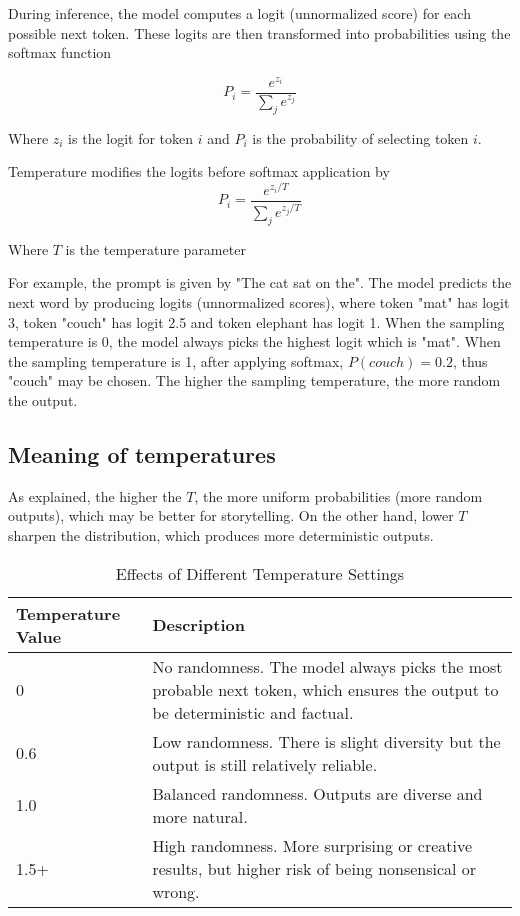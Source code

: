 \documentclass{article} %
\begin{document}
During inference, the model computes a logit (unnormalized score) for each possible next token. These logits are then transformed into probabilities using the softmax function

\[ P_i = \frac{e^{z_i}}{\sum_j e^{z_j}} \]

Where \( z_i \) is the logit for token \( i \) and \( P_i \) is the probability of selecting token \( i \).

Temperature modifies the logits before softmax application by 
\[ P_i = \frac{e^{z_i/T}}{\sum_j e^{z_j/T}} \]

Where \( T \) is the temperature parameter

For example, the prompt is given by "The cat sat on the". The model predicts the next word by producing logits (unnormalized scores), where token "mat" has logit 3, token "couch" has logit 2.5 and token elephant has logit 1. When the sampling temperature is 0, the model always picks the highest logit which is "mat". When the sampling temperature is 1, after applying softmax, \(P(couch) = 0.2\), thus "couch" may be chosen. The higher the sampling temperature, the more random the output.

\subsection{Meaning of temperatures}
As explained, the higher the \(T\), the more uniform probabilities (more random outputs), which may be better for storytelling. On the other hand, lower \( T \) sharpen the distribution, which produces more deterministic outputs.

\begin{table}[H]
\centering
\begin{tabular}{|p{5cm}|p{8cm}|}

\hline
\textbf{Temperature Value} & \textbf{Description} \\ 
\hline
0 & No randomness. The model always picks the most probable next token, which ensures the output to be deterministic and factual. \\
\hline
0.6 & Low randomness. There is slight diversity but the output is still relatively reliable. \\
\hline
1.0 & Balanced randomness. Outputs are diverse and more natural. \\
\hline
1.5+ & High randomness. More surprising or creative results, but higher risk of being nonsensical or wrong. \\
\hline
\end{tabular}
\caption{Effects of Different Temperature Settings}
\label{tab:temperature}
\end{table}
\end{document}
